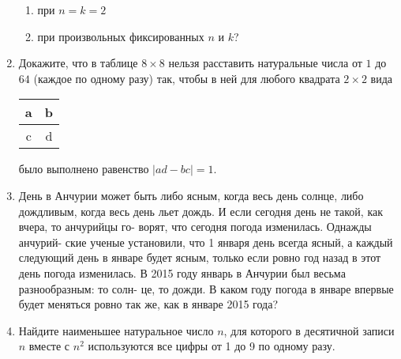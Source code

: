 \begin{enumerate}
\begin{enumerate}[label=(\asbuk*)]
        \item при $n=k=2$
        \item при произвольных фиксированных $n$ и $k$?
      \end{enumerate}
    \item  Докажите, что в таблице $8\times8$ нельзя расставить натуральные числа от $1$ до $64$ (каждое по одному разу) так,
      чтобы в ней для любого квадрата $2\times2$ вида \begin{tabular}{|c|c|}
      \hline
      a & b \\
      \hline
      c & d\\
      \hline
    \end{tabular} было выполнено равенство $|ad - bc| = 1$.
    \item День в Анчурии может быть либо ясным, когда весь
день солнце, либо дождливым, когда весь день льет дождь.
И если сегодня день не такой, как вчера, то анчурийцы го-
ворят, что сегодня погода изменилась. Однажды анчурий-
ские ученые установили, что 1 января день всегда ясный,
а каждый следующий день в январе будет ясным, только
если ровно год назад в этот день погода изменилась. В 2015
году январь в Анчурии был весьма разнообразным: то солн-
це, то дожди. В каком году погода в январе впервые будет
меняться ровно так же, как в январе 2015 года?
    \item Найдите наименьшее натуральное число $n$, для которого в десятичной записи $n$ вместе
      с $n^2$ используются все цифры от 1 до 9 {} по одному разу.
  \end{enumerate}

